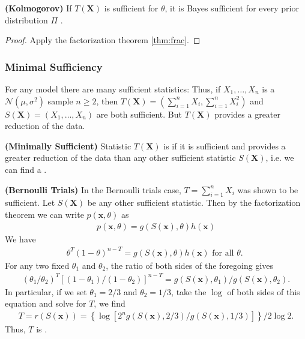 \documentclass{article}
\newcommand{\bfs}[1]{\textbf{({#1}) }}
\begin{document}
\begin{thma}\bfs{Kolmogorov}
 If $T(\mathbf{X})$ is sufficient for $\theta$, it is Bayes sufficient for every prior distribution $\Pi$ .
\end{thma}
\begin{proof}
Apply the factorization theorem \cref{thm:frac}.
\end{proof}

\subsubsection{Minimal Sufficiency}
For any model there are many sufficient statistics: Thus, if $X_{1}, \ldots, X_{n}$ is a $\mathcal{N}\left(\mu, \sigma^{2}\right)$ sample $n \geq 2$, then $T(\mathbf{X})=\left(\sum_{i=1}^{n} X_{i}, \sum_{i=1}^{n} X_{i}^{2}\right)$ and $S(\mathbf{X})=\left(X_{1}, \ldots, X_{n}\right)$ are both sufficient. But $T(\mathbf{X})$ provides a greater reduction of the data. 
\begin{defa}\bfs{Minimally Sufficient}
Statistic $T(\mathbf{X})$ is  if it is sufficient and provides a greater reduction of the data
than any other sufficient statistic $S(\mathbf{X})$, i.e. we can find a .
\end{defa}


\begin{exma}\bfs{Bernoulli Trials} \label{ex:ber_trial2}
  In the Bernoulli trials case, $T=\sum_{i=1}^{n} X_{i}$ was shown to be sufficient. Let $S(\mathbf{X})$ be any other sufficient statistic. Then by the factorization theorem we can write $p(\mathbf{x}, \theta)$ as
\begin{align*}
p(\mathbf{x}, \theta)=g(S(\mathbf{x}), \theta) h(\mathbf{x})
\end{align*}
We have 
\begin{align*}
\theta^{T}(1-\theta)^{n-T}=g(S(\mathbf{x}), \theta) h(\mathbf{x}) \text { for all } \theta \text {. }
\end{align*}
For any two fixed $\theta_{1}$ and $\theta_{2}$, the ratio of both sides of the foregoing gives
\begin{align*}
\left(\theta_{1} / \theta_{2}\right)^{T}\left[\left(1-\theta_{1}\right) /\left(1-\theta_{2}\right)\right]^{n-T}=g\left(S(\mathbf{x}), \theta_{1}\right) / g\left(S(\mathbf{x}), \theta_{2}\right) .
\end{align*}
In particular, if we set $\theta_{1}=2 / 3$ and $\theta_{2}=1 / 3$, take the $\log$ of both sides of this equation and solve for $T$, we find
\begin{align*}
T=r(S(\mathbf{x}))=\left\{\log \left[2^{n} g(S(\mathbf{x}), 2 / 3) / g(S(\mathbf{x}), 1 / 3)\right]\right\} / 2 \log 2 .
\end{align*}
Thus, $T$ is .
\end{exma} 
\end{document}
